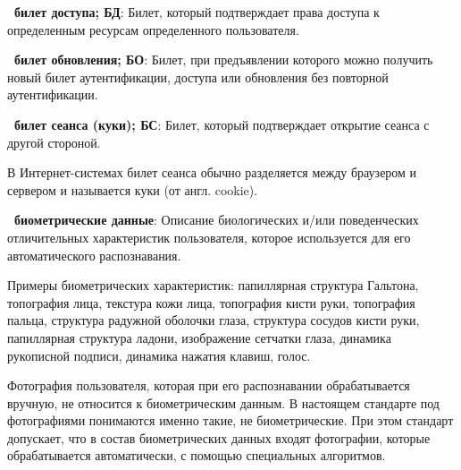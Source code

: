 {\bf \thedefctr~билет доступа; БД}:
Билет, который подтверждает права доступа к определенным ресурсам определенного 
пользователя.



{\bf \thedefctr~билет обновления; БО}:
Билет, при предъявлении которого можно получить новый билет 
аутентификации, доступа или обновления без повторной аутентификации.

{\bf \thedefctr~билет сеанса (куки); БС}:
Билет, который подтверждает открытие сеанса с другой стороной. 

\begin{note*}
В Интернет-системах билет сеанса обычно разделяется между браузером и 
сервером и называется куки (от англ. cookie).
\end{note*}

{\bf \thedefctr~биометрические данные}:
Описание биологических и/или поведенческих отличительных характеристик 
пользователя, которое используется для его автоматического распознавания.

\begin{note}
Примеры биометрических характеристик: папиллярная структура Гальтона, 
топография лица, текстура кожи лица, топография кисти руки, 
топография пальца, структура радужной оболочки глаза, 
структура сосудов кисти руки, 
папиллярная структура ладони, изображение сетчатки глаза, 
динамика рукописной подписи, динамика нажатия клавиш, голос.
\end{note}

\begin{note}
Фотография пользователя, которая при его распознавании обрабатывается вручную,
не относится к биометрическим данным. В настоящем стандарте под фотографиями 
понимаются именно такие, не биометрические. При этом стандарт допускает, что в 
состав биометрических данных входят фотографии, которые обрабатывается 
автоматически, с помощью специальных алгоритмов.
\end{note}

%
% 
%
% 

